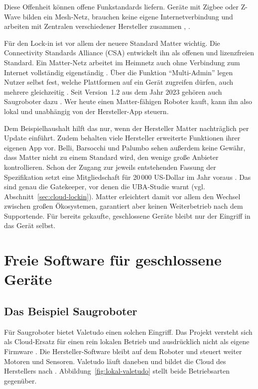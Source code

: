 Diese Offenheit können offene Funkstandards liefern. Geräte mit Zigbee oder
Z-Wave bilden ein Mesh-Netz, brauchen keine eigene Internetverbindung und
arbeiten mit Zentralen verschiedener Hersteller zusammen
\cite[Abschn.~\enquote{Consumers}]{csa:zigbee},
\cite[Abschn.~\enquote{Z-Wave Technology Essentials}]{zwave:oj}.

Für den Lock-in ist vor allem der neuere Standard Matter wichtig. Die
Connectivity Standards Alliance (\acrshort{CSA}) entwickelt ihn als offenen
und lizenzfreien Standard. Ein Matter-Netz arbeitet im Heimnetz auch ohne
Verbindung zum Internet vollständig eigenständig \cite[S.~1, 7]{belli:2024}. Über
die Funktion \enquote{Multi-Admin} legen Nutzer selbst fest, welche Plattformen
auf ein Gerät zugreifen dürfen, auch mehrere gleichzeitig
\cite[Abschn.~\enquote{Security and Privacy}]{csa:matterfaq}.
Seit Version~1.2 aus dem Jahr 2023 gehören auch Saugroboter dazu
\cite[Abschn.~\enquote{Nine New Device Types}]{csa:2023}. Wer heute einen
Matter-fähigen Roboter kauft, kann ihn also lokal und unabhängig von der
Hersteller-App steuern.

Dem Beispielhaushalt hilft das nur, wenn der Hersteller Matter nachträglich
per Update einführt. Zudem behalten viele Hersteller erweiterte Funktionen
ihrer eigenen App vor. Belli, Barsocchi und Palumbo sehen außerdem keine
Gewähr, dass Matter nicht zu einem Standard wird, den wenige große Anbieter
kontrollieren. Schon der Zugang zur jeweils entstehenden Fassung der
Spezifikation setzt eine Mitgliedschaft für 20\,000 US-Dollar im Jahr voraus
\cite[S.~24]{belli:2024}. Das sind genau die Gatekeeper, vor denen die
\acrshort{UBA}-Studie warnt (vgl. Abschnitt~\ref{sec:cloud-lockin}). Matter erleichtert damit vor allem
den Wechsel zwischen großen Ökosystemen, garantiert aber keinen Weiterbetrieb
nach dem Supportende. Für bereits gekaufte, geschlossene Geräte bleibt nur der
Eingriff in das Gerät selbst.

\section{Freie Software für geschlossene Geräte}\label{sec:lokal-firmware}

\subsection{Das Beispiel Saugroboter}\label{sec:lokal-valetudo}

Für Saugroboter bietet Valetudo einen solchen Eingriff. Das Projekt versteht
sich als Cloud-Ersatz für einen rein lokalen Betrieb und ausdrücklich nicht als
eigene Firmware \cite[Abschn.~\enquote{What is Valetudo?}]{valetudo:2025}. Die
Hersteller-Software bleibt auf dem Roboter und steuert weiter Motoren und
Sensoren. Valetudo läuft daneben und bildet die Cloud des Herstellers nach
\cite[Abschn.~\enquote{Robots that aren't supported}]{valetudo:robots}.
Abbildung~\ref{fig:lokal-valetudo} stellt beide Betriebsarten gegenüber.

